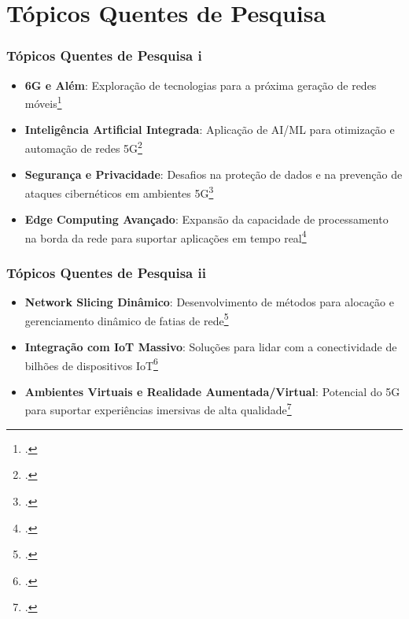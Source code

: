
\section{Tópicos Quentes de Pesquisa}
\begin{frame}
    \frametitle{Tópicos Quentes de Pesquisa i}
    \begin{itemize}
        \item \textbf{6G e Além}: Exploração de tecnologias para a próxima geração de redes móveis\footcite{6G_beyond}
        \item \textbf{Inteligência Artificial Integrada}: Aplicação de AI/ML para otimização e automação de redes 5G\footcite{AI_5G}
        \item \textbf{Segurança e Privacidade}: Desafios na proteção de dados e na prevenção de ataques cibernéticos em ambientes 5G\footcite{Security_5G}
        \item \textbf{Edge Computing Avançado}: Expansão da capacidade de processamento na borda da rede para suportar aplicações em tempo real\footcite{MEC_5G}
    \end{itemize}
    \vspace{1cm}
\end{frame}

\begin{frame}
    \frametitle{Tópicos Quentes de Pesquisa ii}
    \begin{itemize}
        \item \textbf{Network Slicing Dinâmico}: Desenvolvimento de métodos para alocação e gerenciamento dinâmico de fatias de rede\footcite{Dynamic_NS}
        \item \textbf{Integração com IoT Massivo}: Soluções para lidar com a conectividade de bilhões de dispositivos IoT\footcite{Massive_IoT}
        \item \textbf{Ambientes Virtuais e Realidade Aumentada/Virtual}: Potencial do 5G para suportar experiências imersivas de alta qualidade\footcite{ARVR_5G}
    \end{itemize}
\end{frame}